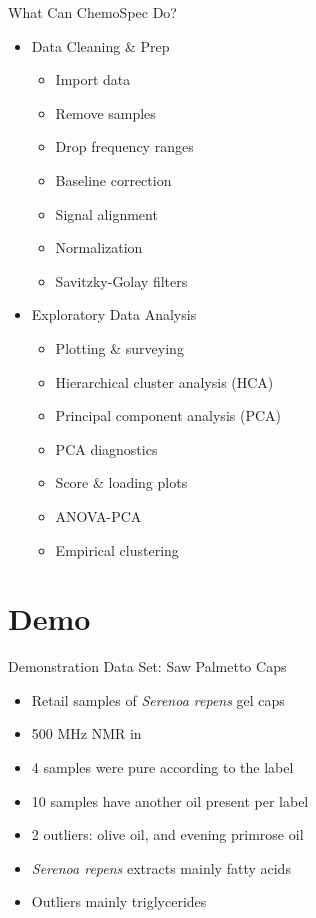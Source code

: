 \documentclass[aspectratio=169]{beamer}\usepackage[]{graphicx}\usepackage[]{color}
\begin{document}

\begin{frame}{What Can ChemoSpec Do?}
\begin{multicols}{2}
  \begin{itemize}
    \item Data Cleaning \& Prep
      \begin{itemize}
        \item Import data
        \item Remove samples
        \item Drop frequency ranges
        \item Baseline correction
        \item Signal alignment
        \item Normalization
        \item Savitzky-Golay filters
      \end{itemize}
  \end{itemize}
\columnbreak
  \begin{itemize}
    \item Exploratory Data Analysis
      \begin{itemize}
        \item Plotting \& surveying
        \item Hierarchical cluster analysis (HCA)
        \item Principal component analysis (PCA)
        \item PCA diagnostics
        \item Score \& loading plots
        \item ANOVA-PCA
        \item Empirical clustering
      \end{itemize}
  \end{itemize}
\end{multicols}

\end{frame}

\section*{Demo}

\begin{frame}{Demonstration Data Set: Saw Palmetto Caps}
  \begin{itemize}
  \item Retail samples of \emph{Serenoa repens} gel caps
  \item 500 MHz  NMR in 
  \item 4 samples were pure according to the label
  \item 10 samples have another oil present per label
  \item 2 outliers: olive oil, and evening primrose oil
  \item \emph{Serenoa repens} extracts mainly fatty acids
  \item Outliers mainly triglycerides
  \end{itemize}
\end{frame}
\end{document}
